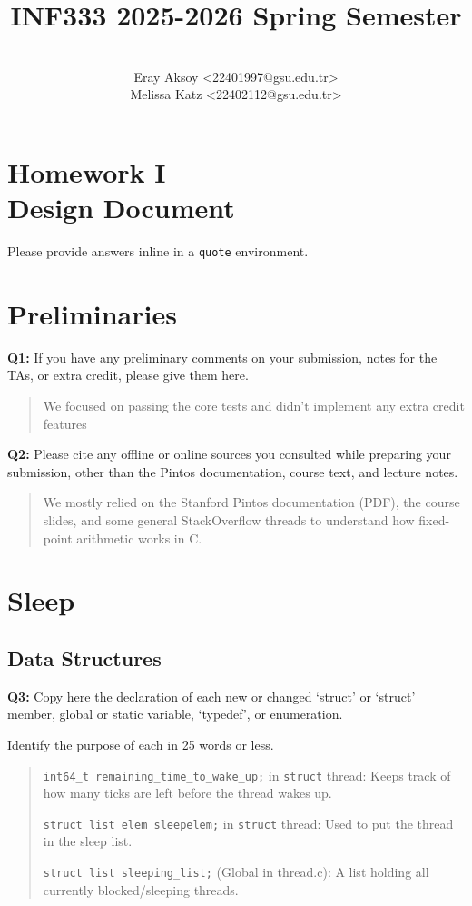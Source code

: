 \documentclass[a4paper,11pt]{paper}
\title{INF333 2025-2026 Spring Semester}
\author{
\\ Eray Aksoy <22401997@gsu.edu.tr>
\\ Melissa Katz <22402112@gsu.edu.tr>}
\begin{document}
\maketitle

\section*{\LARGE Homework I \\
Design Document}

Please provide answers inline in a \texttt{quote} environment.

\section{Preliminaries}

\textbf{Q1:} If you have any preliminary comments on your submission, notes for
the TAs, or extra credit, please give them here.
\begin{quote}
  We focused on passing the core tests and didn't implement any extra credit features
\end{quote}


\textbf{Q2:} Please cite any offline or online sources you consulted while
preparing your submission, other than the Pintos documentation, course text, and
lecture notes.

\begin{quote}
  We mostly relied on the Stanford Pintos documentation (PDF), the course slides, and some general StackOverflow threads to understand how fixed-point arithmetic works in C.
\end{quote}


\section{Sleep}

\subsection{Data Structures}

\textbf{Q3:} Copy here the declaration of each new or changed `struct' or
`struct' member, global or static variable, `typedef', or enumeration.

Identify the purpose of each in 25 words or less.
\begin{quote}
  \texttt{int64\_t remaining\_time\_to\_wake\_up;} in \texttt{struct} thread: Keeps track of how many ticks are left before the thread wakes up.

\texttt{struct list\_elem sleepelem;} in \texttt{struct} thread: Used to put the thread in the sleep list.

\texttt{struct list sleeping\_list;} (Global in thread.c): A list holding all currently blocked/sleeping threads.
\end{quote}
\end{document}
